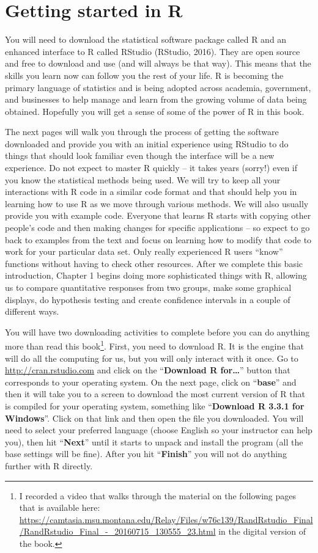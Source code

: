 \documentclass[]{book}
\let\rmarkdownfootnote\footnote%
\def\footnote{\protect\rmarkdownfootnote}
\begin{document}
\section{Getting started in R}\label{getting-started-in-r}

You will need to download the statistical software package called R and
an enhanced interface to R called RStudio (RStudio, 2016). They are open
source and free to download and use (and will always be that way). This
means that the skills you learn now can follow you the rest of your
life. R is becoming the primary language of statistics and is being
adopted across academia, government, and businesses to help manage and
learn from the growing volume of data being obtained. Hopefully you will
get a sense of some of the power of R in this book.

The next pages will walk you through the process of getting the software
downloaded and provide you with an initial experience using RStudio to
do things that should look familiar even though the interface will be a
new experience. Do not expect to master R quickly -- it takes years
(sorry!) even if you know the statistical methods being used. We will
try to keep all your interactions with R code in a similar code format
and that should help you in learning how to use R as we move through
various methods. We will also usually provide you with example code.
Everyone that learns R starts with copying other people's code and then
making changes for specific applications -- so expect to go back to
examples from the text and focus on learning how to modify that code to
work for your particular data set. Only really experienced R users
``know'' functions without having to check other resources. After we
complete this basic introduction, Chapter 1 begins doing more
sophisticated things with R, allowing us to compare quantitative
responses from two groups, make some graphical displays, do hypothesis
testing and create confidence intervals in a couple of different ways.

You will have two downloading activities to complete before you can do
anything more than read this book\footnote{I recorded a video that walks
  through the material on the following pages that is available here:
  \url{https://camtasia.msu.montana.edu/Relay/Files/w76c139/RandRstudio_Final/RandRstudio_Final_-_20160715_130555_23.html}
  in the digital version of the book.}. First, you need to download R.
It is the engine that will do all the computing for us, but you will
only interact with it once. Go to \url{http://cran.rstudio.com} and
click on the ``\textbf{Download R for\ldots{}}'' button that corresponds
to your operating system. On the next page, click on ``\textbf{base}''
and then it will take you to a screen to download the most current
version of R that is compiled for your operating system, something like
``\textbf{Download R 3.3.1 for Windows}''. Click on that link and then
open the file you downloaded. You will need to select your preferred
language (choose English so your instructor can help you), then hit
``\textbf{Next}'' until it starts to unpack and install the program (all
the base settings will be fine). After you hit ``\textbf{Finish}'' you
will not do anything further with R directly.
\end{document}
